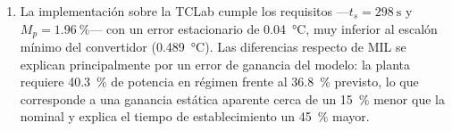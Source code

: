 \documentclass[conference,a4paper,10pt]{IEEEtran}
\begin{document}
\begin{enumerate}[leftmargin=*]
\item La implementación sobre la TCLab cumple los requisitos ---$t_s = \SI{298}{\second}$ y
$M_p = \SI{1.96}{\percent}$--- con un error estacionario de \SI{0.04}{\celsius}, muy inferior al
escalón mínimo del convertidor (\SI{0.489}{\celsius}). Las diferencias respecto de MIL se explican
principalmente por un error de ganancia del modelo: la planta requiere \SI{40.3}{\percent} de
potencia en régimen frente al \SI{36.8}{\percent} previsto, lo que corresponde a una ganancia
estática aparente cerca de un \SI{15}{\percent} menor que la nominal y explica el tiempo de
establecimiento un \SI{45}{\percent} mayor.

\end{enumerate}


\balance
\end{document}
